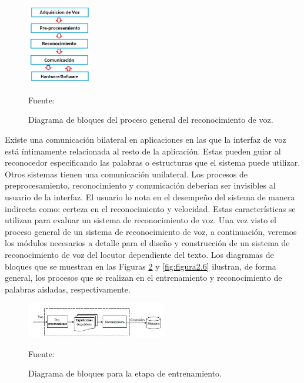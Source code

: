 \begin{figure}[ht]
\begin{center}
\includegraphics[width=0.25\textwidth]{Imagenes/Cap2/image004}
\end{center}
\begin{center}
\vskip -0.5cm
\caption{\small{Diagrama de bloques del proceso general del reconocimiento de voz.}}
\label{fig:figura2.4}
{\small{Fuente: \cite{rama}}}
\end{center}
\end{figure}

Existe una comunicación bilateral en aplicaciones en las que la interfaz de voz está íntimamente relacionada al resto de la aplicación. Estas pueden guiar al reconocedor especificando las palabras o estructuras que el sistema puede utilizar. Otros sistemas tienen una comunicación unilateral.
\vskip 0.5cm
Los procesos de preprocesamiento, reconocimiento y comunicación deberían ser invisibles al usuario de la interfaz. El usuario lo nota en el desempeño del sistema de manera indirecta como: certeza en el reconocimiento y velocidad. Estas características se utilizan para evaluar un sistema de reconocimiento de voz.
\vskip 0.5cm
Una vez visto el proceso general de un sistema de reconocimiento de voz, a continuación, veremos los módulos necesarios a detalle para el diseño y construcción de un sistema de reconocimiento de voz del locutor dependiente del texto. 
\vskip 0.5cm
Los diagramas de bloques que se muestran en las Figuras \ref{fig:figura2.5} y \ref{fig:figura2.6} ilustran, de forma general, los procesos que se realizan en el entrenamiento y reconocimiento de palabras aisladas, respectivamente.

\begin{figure}[ht]
\begin{center}
\includegraphics[width=0.55\textwidth]{Imagenes/Cap2/image005}
\end{center}
\begin{center}
\vskip -0.5cm
\caption{\small{Diagrama de bloques para la etapa de entrenamiento.}}
\label{fig:figura2.5}
{\small{Fuente: \cite{navarrete}}}
\end{center}
\end{figure}

